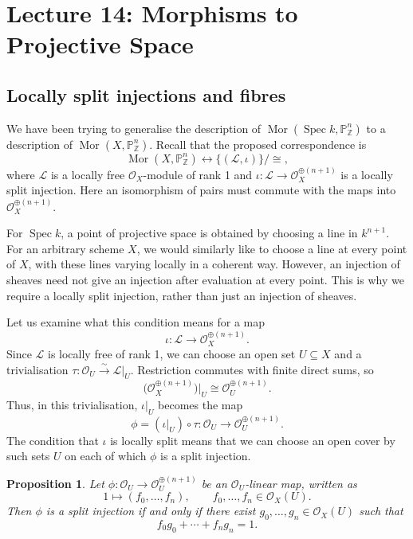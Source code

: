 \documentclass{article}
\theoremstyle{definition}
\theoremstyle{remark}
\theoremstyle{plain}
\newtheorem{proposition}{Proposition}[section]
\DeclareMathOperator{\Spec}{Spec}
\newcommand{\Z}{\mathbb{Z}}
\renewcommand{\P}{\mathbb{P}}
\begin{document}
\setcounter{section}{13}

\section*{Lecture 14: Morphisms to Projective Space}

\subsection*{Locally split injections and fibres}

We have been trying to generalise the description of
\(\operatorname{Mor}(\Spec k,\P^n_\Z)\) to a description of
\(\operatorname{Mor}(X,\P^n_\Z)\). Recall that the proposed correspondence is
\[
    \operatorname{Mor}(X,\P^n_\Z)
    \longleftrightarrow
    \{(\mathcal{L},\iota)\}/\cong,
\]
where \(\mathcal{L}\) is a locally free \(\mathcal{O}_X\)-module of rank 1
and \(\iota:\mathcal{L}\to\mathcal{O}_X^{\oplus(n+1)}\) is a locally split
injection. Here an isomorphism of pairs must commute with the maps into
\(\mathcal{O}_X^{\oplus(n+1)}\).

For \(\Spec k\), a point of projective space is obtained by choosing a line
in \(k^{n+1}\). For an arbitrary scheme \(X\), we would similarly like to
choose a line at every point of \(X\), with these lines varying locally in
a coherent way. However, an injection of sheaves need not give an injection
after evaluation at every point. This is why we require a locally split
injection, rather than just an injection of sheaves.

Let us examine what this condition means for a map
\[
    \iota:\mathcal{L}\longrightarrow\mathcal{O}_X^{\oplus(n+1)}.
\]
Since \(\mathcal{L}\) is locally free of rank 1, we can choose an open set
\(U\subseteq X\) and a trivialisation
\(\tau:\mathcal{O}_U\xrightarrow{\sim}\mathcal{L}|_U\).
Restriction commutes with finite direct sums, so
\[
    \bigl(\mathcal{O}_X^{\oplus(n+1)}\bigr)|_U
    \cong\mathcal{O}_U^{\oplus(n+1)}.
\]
Thus, in this trivialisation, \(\iota|_U\) becomes the map
\[
    \phi=(\iota|_U)\circ\tau:
    \mathcal{O}_U\longrightarrow\mathcal{O}_U^{\oplus(n+1)}.
\]
The condition that \(\iota\) is locally split means that we can choose an
open cover by such sets \(U\) on each of which \(\phi\) is a split injection.

\begin{proposition}\label{prop:lsi-section-criterion}
    Let \(\phi:\mathcal{O}_U\to\mathcal{O}_U^{\oplus(n+1)}\) be an
    \(\mathcal{O}_U\)-linear map, written as
    \[
        1\longmapsto(f_0,\dots,f_n),
        \qquad f_0,\dots,f_n\in\mathcal{O}_X(U).
    \]
    Then \(\phi\) is a split injection if and only if there exist
    \(g_0,\dots,g_n\in\mathcal{O}_X(U)\) such that
    \[
        f_0g_0+\cdots+f_ng_n=1.
    \]
\end{proposition}
\end{document}
